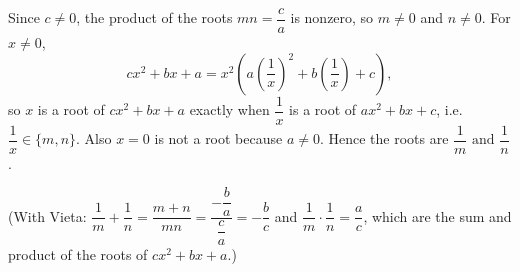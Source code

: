 Since $c\ne0$, the product of the roots $mn=\dfrac {c}{a}$ is nonzero, so $m\ne0$ and $n\ne0$. For $x\ne0$,
\[
cx^2+bx+a=x^2\left(a\left(\dfrac{1}{x}\right)^2+b\left(\dfrac{1}{x}\right)+c\right),
\]
so $x$ is a root of $cx^2+bx+a$ exactly when $\dfrac{1}{x}$ is a root of $ax^2+bx+c$, i.e. $\dfrac{1}{x}\in\{m,n\}$. Also $x=0$ is not a root because $a\ne0$. Hence the roots are $\boxed{\dfrac{1}{m}\text{ and }\dfrac{1}{n}}$.

(With Vieta: $\dfrac{1}{m}+\dfrac{1}{n}=\dfrac{m+n}{mn}=\dfrac{-\dfrac {b}{a}}{\dfrac {c}{a}}=-\dfrac {b}{c}$ and $\dfrac{1}{m}\cdot\dfrac{1}{n}=\dfrac {a}{c}$, which are the sum and product of the roots of $cx^2+bx+a$.)
